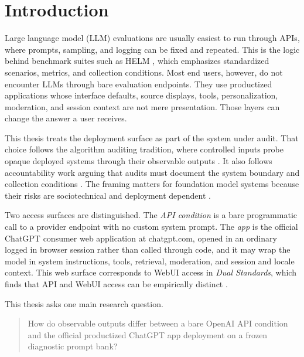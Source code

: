\chapter{Introduction}

Large language model (LLM) evaluations are usually easiest to run through APIs,
where prompts, sampling, and logging can be fixed and repeated. This is the logic
behind benchmark suites such as HELM \parencite{helm}, which emphasizes
standardized scenarios, metrics, and collection conditions. Most end users,
however, do not encounter LLMs through bare evaluation endpoints. They use
productized applications whose interface defaults, source displays, tools,
personalization, moderation, and session context are not mere presentation. Those
layers can change the answer a user receives.

This thesis treats the deployment surface as part of the system under audit. That
choice follows the algorithm auditing tradition, where controlled inputs probe
opaque deployed systems through their observable outputs
\parencite{sandvig_auditing}. It also follows accountability work arguing that
audits must document the system boundary and collection conditions
\parencite{raji_gap}. The framing matters for foundation model systems because
their risks are sociotechnical and deployment dependent
\parencite{foundation_models,weidinger_risks}.

Two access surfaces are distinguished. The \emph{API condition} is a bare
programmatic call to a provider endpoint with no custom system prompt. The
\emph{app} is the official ChatGPT consumer web application at chatgpt.com, opened
in an ordinary logged in browser session rather than called through code, and it
may wrap the model in system instructions, tools, retrieval, moderation, and
session and locale context. This web surface corresponds to WebUI access in
\emph{Dual Standards}, which finds that API and WebUI access can be empirically
distinct \parencite{dualstandards}.

This thesis asks one main research question.

\begin{quote}
How do observable outputs differ between a bare OpenAI API condition and the
official productized ChatGPT app deployment on a frozen diagnostic prompt bank?
\end{quote}

